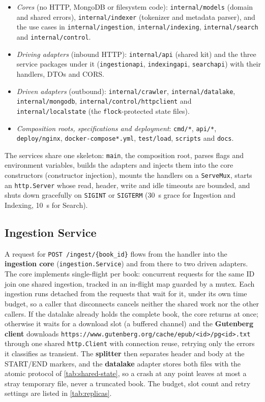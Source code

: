 \documentclass[10pt,a4paper]{article}
\newcommand{\code}[1]{\texttt{#1}}
\newcommand{\route}[1]{\texttt{#1}}
\begin{document}
\begin{itemize}
  \item \emph{Cores} (no HTTP, MongoDB or filesystem code): \code{internal/models}
    (domain and shared errors), \code{internal/indexer} (tokenizer and metadata
    parser), and the use cases in \code{internal/ingestion},
    \code{internal/indexing}, \code{internal/search} and
    \code{internal/control}.
  \item \emph{Driving adapters} (inbound HTTP): \code{internal/api} (shared
    kit) and the three service packages under it (\code{ingestionapi},
    \code{indexingapi}, \code{searchapi}) with their handlers, DTOs and CORS.
  \item \emph{Driven adapters} (outbound): \code{internal/crawler},
    \code{internal/datalake}, \code{internal/mongodb},
    \code{internal/control/httpclient} and \code{internal/localstate} (the
    \code{flock}-protected state files).
  \item \emph{Composition roots, specifications and deployment}: \code{cmd/*},
    \code{api/*}, \code{deploy/nginx}, \code{docker-compose*.yml},
    \code{test/load}, \code{scripts} and \code{docs}.
\end{itemize}

The services share one skeleton: \code{main}, the composition root, parses
flags and environment variables, builds the adapters and injects them into the
core constructors (constructor injection), mounts the handlers on a
\code{ServeMux}, starts an \code{http.Server} whose read, header, write and
idle timeouts are bounded, and shuts down gracefully on \code{SIGINT} or
\code{SIGTERM} (30~s grace for Ingestion and Indexing, 10~s for Search).

\subsection{Ingestion Service}
\label{sec:impl-ingestion}

A request for \route{POST /ingest/\allowbreak\{book\_id\}} flows from the handler into
the \textbf{ingestion core} (\code{ingestion.Service}) and from there to two
driven adapters. The core implements single-flight per book: concurrent
requests for the same ID join one shared ingestion, tracked in an in-flight map
guarded by a mutex. Each ingestion runs detached from the requests that wait
for it, under its own time budget, so a caller that disconnects cancels neither
the shared work nor the other callers. If the datalake already holds the
complete book, the core returns at once; otherwise it waits for a download slot
(a buffered channel) and the \textbf{Gutenberg client} downloads
\code{https://www.gutenberg.org/\allowbreak cache/epub/<id>/pg<id>.txt} through one shared
\code{http.Client} with connection reuse, retrying only the errors it
classifies as transient. The \textbf{splitter} then separates header and body
at the START/END markers, and the \textbf{datalake} adapter stores both files
with the atomic protocol of \cref{tab:shared-state}, so a crash at any point
leaves at most a stray temporary file, never a truncated book. The budget, slot
count and retry settings are listed in \cref{tab:replicas}.
\end{document}
